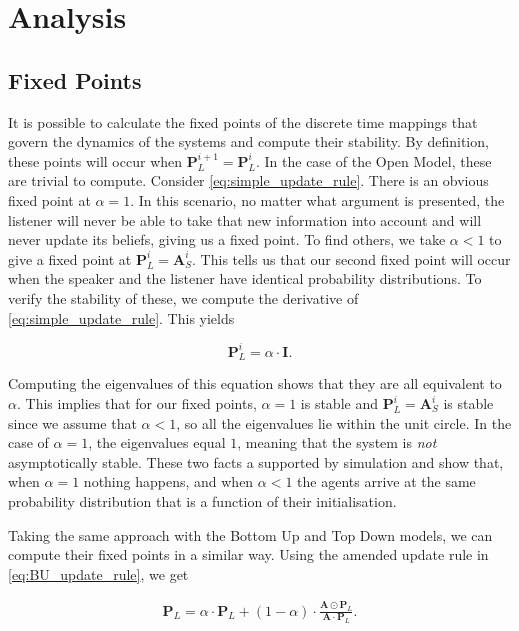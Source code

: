 \section{Analysis}

\subsection{Fixed Points}

It is possible to calculate the fixed points of the discrete time mappings that govern the dynamics of the systems and compute their stability. By definition, these points will occur when $\mathbf{P}^{i+1}_L = \mathbf{P}^{i}_L$. In the case of the Open Model, these are trivial to compute. Consider \cref{eq:simple_update_rule}. There is an obvious fixed point at $\alpha = 1$. In this scenario, no matter what argument is presented, the listener will never be able to take that new information into account and will never update its beliefs, giving us a fixed point. To find others, we take $\alpha < 1$ to give a fixed point at $\mathbf{P}^i_L = \mathbf{A}^i_S$. This tells us that our second fixed point will occur when the speaker and the listener have identical probability distributions. To verify the stability of these, we compute the derivative of \cref{eq:simple_update_rule}. This yields

\begin{equation}
    \mathbf{P}^i_L = \alpha \cdot \mathbf{I} .
\end{equation}

Computing the eigenvalues of this equation shows that they are all equivalent to $\alpha$. This implies that for our fixed points, $\alpha = 1$ is stable and $\mathbf{P}^i_L = \mathbf{A}^i_S$ is stable since we assume that $\alpha < 1$, so all the eigenvalues lie within the unit circle. In the case of $\alpha = 1$, the eigenvalues equal $1$, meaning that the system is \emph{not} asymptotically stable. These two facts a supported by simulation and show that, when $\alpha = 1$ nothing happens, and when $\alpha < 1 $ the agents arrive at the same probability distribution that is a function of their initialisation. 

Taking the same approach with the Bottom Up and Top Down models, we can compute their fixed points in a similar way. Using the amended update rule in \cref{eq:BU_update_rule}, we get

\begin{align*}
    \mathbf{P}_L = \alpha \cdot \mathbf{P}_L + (1 - \alpha) \cdot \frac{\mathbf{A} \odot \mathbf{P}_L}{\mathbf{A} \cdot \mathbf{P}_L}.
\end{align*}


